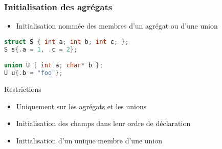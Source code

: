 \documentclass[C++.tex]{subfiles}
\begin{document}
\begin{frame}[fragile]
	\frametitle{Initialisation des agrégats}
	\begin{itemize}
		\item Initialisation nommée des membres d'un agrégat ou d'une union

	\end{itemize}

	\begin{lstlisting}[language=C++]
struct S { int a; int b; int c; }; 
S s{.a = 1, .c = 2};

union U { int a; char* b };
U u{.b = "foo"}; \end{lstlisting}

	\begin{alertblock}{Restrictions}
		\begin{itemize}
			\item Uniquement sur les agrégats et les unions
			\item Initialisation des champs dans leur ordre de déclaration
			\item Initialisation d'un unique membre d'une union

		\end{itemize}
	\end{alertblock}


\end{frame}
\end{document}
